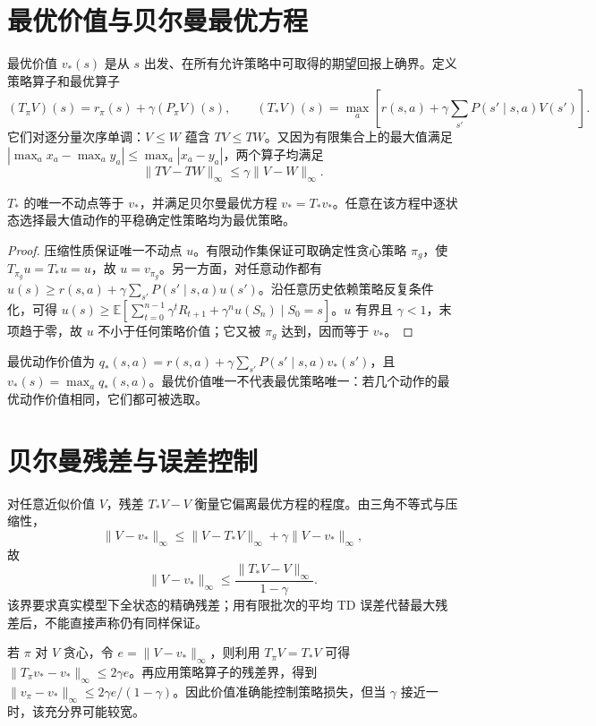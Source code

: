 \documentclass[UTF8,12pt,a4paper,fontset=fandol]{ctexbook}
\begin{document}
\section{最优价值与贝尔曼最优方程}

最优价值 $v_*(s)$ 是从 $s$ 出发、在所有允许策略中可取得的期望回报上确界。定义策略算子和最优算子
\[
(T_\pi V)(s)=r_\pi(s)+\gamma(P_\pi V)(s),\qquad
(T_*V)(s)=\max_a\left[r(s,a)+\gamma\sum_{s'}P(s'\mid s,a)V(s')\right].
\]
它们对逐分量次序单调：$V\leq W$ 蕴含 $TV\leq TW$。又因为有限集合上的最大值满足 $|\max_a x_a-\max_a y_a|\leq\max_a|x_a-y_a|$，两个算子均满足
\begin{equation}
\|TV-TW\|_\infty\leq\gamma\|V-W\|_\infty.
\label{eq:rl-bellman-contraction}
\end{equation}

\begin{theorem}[有限折扣模型的最优性]
$T_*$ 的唯一不动点等于 $v_*$，并满足贝尔曼最优方程 $v_*=T_*v_*$。任意在该方程中逐状态选择最大值动作的平稳确定性策略均为最优策略。
\end{theorem}
\begin{proof}
压缩性质保证唯一不动点 $u$。有限动作集保证可取确定性贪心策略 $\pi_g$，使 $T_{\pi_g}u=T_*u=u$，故 $u=v_{\pi_g}$。另一方面，对任意动作都有 $u(s)\geq r(s,a)+\gamma\sum_{s'}P(s'\mid s,a)u(s')$。沿任意历史依赖策略反复条件化，可得 $u(s)\geq\mathbb E[\sum_{t=0}^{n-1}\gamma^tR_{t+1}+\gamma^nu(S_n)\mid S_0=s]$。$u$ 有界且 $\gamma<1$，末项趋于零，故 $u$ 不小于任何策略价值；它又被 $\pi_g$ 达到，因而等于 $v_*$。
\end{proof}

最优动作价值为 $q_*(s,a)=r(s,a)+\gamma\sum_{s'}P(s'\mid s,a)v_*(s')$，且 $v_*(s)=\max_aq_*(s,a)$。最优价值唯一不代表最优策略唯一：若几个动作的最优动作价值相同，它们都可被选取。

\section{贝尔曼残差与误差控制}

对任意近似价值 $V$，残差 $T_*V-V$ 衡量它偏离最优方程的程度。由三角不等式与压缩性，
\[
\|V-v_*\|_\infty\leq\|V-T_*V\|_\infty+\gamma\|V-v_*\|_\infty,
\]
故
\begin{equation}
\|V-v_*\|_\infty\leq\frac{\|T_*V-V\|_\infty}{1-\gamma}.
\label{eq:rl-residual-bound}
\end{equation}
该界要求真实模型下全状态的精确残差；用有限批次的平均 TD 误差代替最大残差后，不能直接声称仍有同样保证。

若 $\pi$ 对 $V$ 贪心，令 $e=\|V-v_*\|_\infty$，则利用 $T_\pi V=T_*V$ 可得 $\|T_\pi v_*-v_*\|_\infty\leq2\gamma e$。再应用策略算子的残差界，得到 $\|v_\pi-v_*\|_\infty\leq2\gamma e/(1-\gamma)$。因此价值准确能控制策略损失，但当 $\gamma$ 接近一时，该充分界可能较宽。
\end{document}
